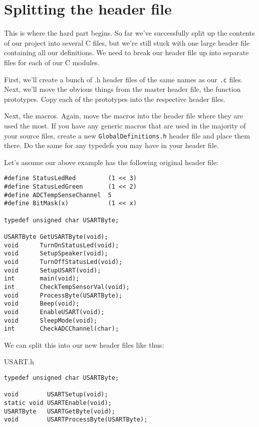 \documentclass[a4paper,oneside,notitlepage]{article}
\begin{document}
\section{Splitting the header file}

This is where the hard part begins. So far we've successfully split up the contents of our project into several C files, but we're still stuck with one large header file containing all our definitions. We need to break our header file up into separate files for each of our C modules.

First, we'll create a bunch of .h header files of the same names as our \texttt{.c} files. Next, we'll move the obvious things from the master header file, the function prototypes. Copy each of the prototypes into the respective header files.

Next, the macros. Again, move the macros into the header file where they are used the most. If you have any generic macros that are used in the majority of your source files, create a new \texttt{GlobalDefinitions.h} header file and place them there. Do the same for any typedefs you may have in your header file.

Let's assume our above example has the following original header file:

\begin{center}
\begin{lstlisting}
#define StatusLedRed         (1 << 3)
#define StatusLedGreen       (1 << 2)
#define ADCTempSenseChannel  5
#define BitMask(x)           (1 << x)

typedef unsigned char USARTByte;

USARTByte GetUSARTByte(void);
void      TurnOnStatusLed(void);
void      SetupSpeaker(void);
void      TurnOffStatusLed(void);
void      SetupUSART(void);
int       main(void);
int       CheckTempSensorVal(void);
void      ProcessByte(USARTByte);
void      Beep(void);
void      EnableUSART(void);
void      SleepMode(void);
int       CheckADCChannel(char);
\end{lstlisting}
\end{center}

We can split this into our new header files like thus:

USART.h
\begin{center}
\begin{lstlisting}
typedef unsigned char USARTByte;

void        USARTSetup(void);
static void USARTEnable(void);
USARTByte   USARTGetByte(void);
void        USARTProcessByte(USARTByte);
\end{lstlisting}
\end{center}
\end{document}
